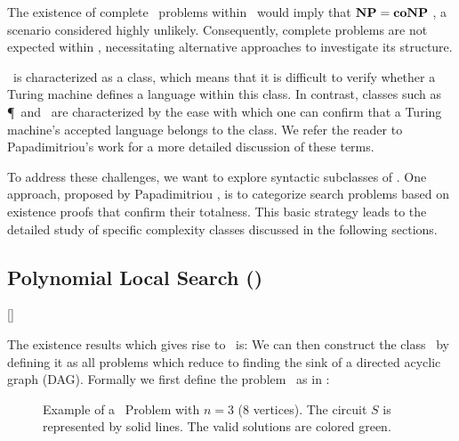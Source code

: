 The existence of complete \FNP\ problems within \TFNP\ would imply that $\textbf{NP} = \textbf{coNP}$ , a scenario considered highly unlikely. Consequently, complete problems are not expected within \TFNP, necessitating alternative approaches to investigate its structure.

\TFNP\ is characterized as a  class, which means that it is difficult to verify whether a Turing machine defines a language within this class. In contrast,  classes such as \P\ and \NP\ are characterized by the ease with which one can confirm that a Turing machine's accepted language belongs to the class. We refer the reader to Papadimitriou's work  for a more detailed discussion of these terms.

To address these challenges, we want to explore syntactic subclasses of \TFNP. One approach, proposed by Papadimitriou \cite{papadimitriou_computational_1994}, is to categorize search problems based on existence proofs that confirm their totalness. This basic strategy leads to the detailed study of specific complexity classes discussed in the following sections.

\subsection{Polynomial Local Search (\PLS)}[\PLS]

The existence results which gives rise to \PLS\ is:
We can then construct the class \PLS\ by defining it as all problems which reduce to finding the sink of a directed acyclic graph (DAG). Formally we first define the problem \Localopt\ as in :


\begin{figure}
    \centering
    \caption[Example of a \Localopt\ Problem]{Example of a \Localopt\ Problem with $n=3$ (8 vertices). The circuit $S$ is represented by solid lines. The valid solutions are colored green.}
    \label{fig:localopt_example}
\end{figure}

